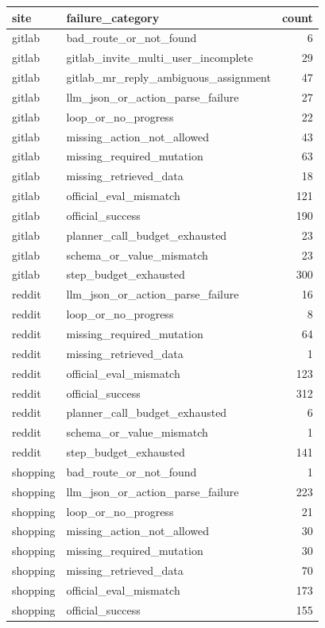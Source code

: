 \begin{tabular}{llr}
\toprule
site & failure_category & count \\
\midrule
gitlab & bad_route_or_not_found & 6 \\
gitlab & gitlab_invite_multi_user_incomplete & 29 \\
gitlab & gitlab_mr_reply_ambiguous_assignment & 47 \\
gitlab & llm_json_or_action_parse_failure & 27 \\
gitlab & loop_or_no_progress & 22 \\
gitlab & missing_action_not_allowed & 43 \\
gitlab & missing_required_mutation & 63 \\
gitlab & missing_retrieved_data & 18 \\
gitlab & official_eval_mismatch & 121 \\
gitlab & official_success & 190 \\
gitlab & planner_call_budget_exhausted & 23 \\
gitlab & schema_or_value_mismatch & 23 \\
gitlab & step_budget_exhausted & 300 \\
reddit & llm_json_or_action_parse_failure & 16 \\
reddit & loop_or_no_progress & 8 \\
reddit & missing_required_mutation & 64 \\
reddit & missing_retrieved_data & 1 \\
reddit & official_eval_mismatch & 123 \\
reddit & official_success & 312 \\
reddit & planner_call_budget_exhausted & 6 \\
reddit & schema_or_value_mismatch & 1 \\
reddit & step_budget_exhausted & 141 \\
shopping & bad_route_or_not_found & 1 \\
shopping & llm_json_or_action_parse_failure & 223 \\
shopping & loop_or_no_progress & 21 \\
shopping & missing_action_not_allowed & 30 \\
shopping & missing_required_mutation & 30 \\
shopping & missing_retrieved_data & 70 \\
shopping & official_eval_mismatch & 173 \\
shopping & official_success & 155 \\

\end{tabular}
